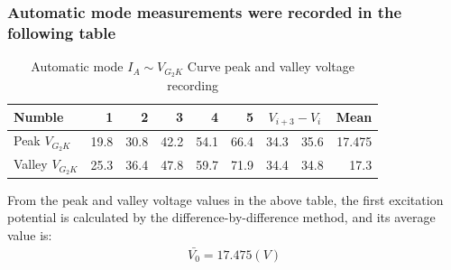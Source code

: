 \documentclass[UTF8]{article}
\begin{document}
	\subsubsection{Automatic mode measurements were recorded in the following table}
\begin{table}[htbp]
  \centering
  \caption{Automatic mode $I_A\sim V_{G_2K}$ Curve peak and valley voltage recording}
    \begin{tabular}{lrrrrrrrr}
    \toprule[2pt]
    Numble & 1     & 2     & 3     & 4     & 5     & \multicolumn{2}{c}{$V_{i+3}-V_i$} & \multicolumn{1}{l}{Mean} \\
    \midrule
    Peak $V_{G_2K}$ & 19.8  & 30.8  & 42.2  & 54.1  & 66.4  & 34.3  & 35.6  & 17.475 \\
    Valley $V_{G_2K}$ & 25.3  & 36.4  & 47.8  & 59.7  & 71.9  & 34.4  & 34.8  & 17.3 \\
  \bottomrule[2pt]
    \end{tabular}%
  \label{tab:addlabel}%
\end{table}%
From the peak and valley voltage values in the above table, the first excitation potential is calculated by the difference-by-difference method, and its average value is:
\begin{eqnarray}
\bar{V_0}=17.475 (V) 
\end{eqnarray}
\end{document}
